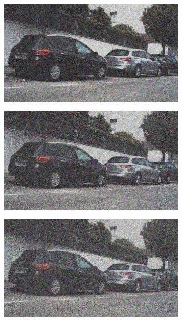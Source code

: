 \documentclass[a4paper]{ctexart}
\begin{document}
\begin{figure}[htbp]
\begin{subfigure}{0.08\textwidth}
				\label{fig：Gamma=0.4, Gauss Noise = 0.4}
			\end{subfigure}
			\begin{subfigure}{0.08\textwidth}
				\captionsetup{font=scriptsize}
				\includegraphics[width=\linewidth]{picture/Edge Detection/degrade/RGB_001 Gamma=0.4, Gauss Noise=0.5}
				\label{fig：Gamma=0.4, Gauss Noise = 0.5}
			\end{subfigure}
			\begin{subfigure}{0.08\textwidth}
				\captionsetup{font=scriptsize}
				\includegraphics[width=\linewidth]{picture/Edge Detection/degrade/RGB_001 Gamma=0.4, Gauss Noise=0.6}
				\label{fig：Gamma=0.4, Gauss Noise = 0.6}
			\end{subfigure}
			\begin{subfigure}{0.08\textwidth}
				\captionsetup{font=scriptsize}
				\includegraphics[width=\linewidth]{picture/Edge Detection/degrade/RGB_001 Gamma=0.4, Gauss Noise=0.7}

\end{subfigure}
\end{figure}
\end{document}
